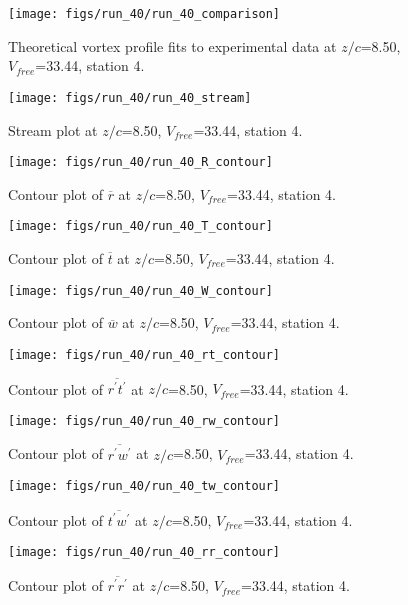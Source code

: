 \begin{figure}[H]
\centering
\texttt{[image: figs/run\_40/run\_40\_comparison]}
\caption{Theoretical vortex profile fits to experimental data at $z/c$=8.50, $V_{free}$=33.44, station 4.}
\end{figure}


\begin{figure}[H]
\centering
\texttt{[image: figs/run\_40/run\_40\_stream]}
\caption{Stream plot at $z/c$=8.50, $V_{free}$=33.44, station 4.}
\end{figure}


\begin{figure}[H]
\centering
\texttt{[image: figs/run\_40/run\_40\_R\_contour]}
\caption{Contour plot of $\overline{r}$ at $z/c$=8.50, $V_{free}$=33.44, station 4.}
\end{figure}


\begin{figure}[H]
\centering
\texttt{[image: figs/run\_40/run\_40\_T\_contour]}
\caption{Contour plot of $\overline{t}$ at $z/c$=8.50, $V_{free}$=33.44, station 4.}
\end{figure}


\begin{figure}[H]
\centering
\texttt{[image: figs/run\_40/run\_40\_W\_contour]}
\caption{Contour plot of $\overline{w}$ at $z/c$=8.50, $V_{free}$=33.44, station 4.}
\end{figure}


\begin{figure}[H]
\centering
\texttt{[image: figs/run\_40/run\_40\_rt\_contour]}
\caption{Contour plot of $\overline{r^\prime t^\prime}$ at $z/c$=8.50, $V_{free}$=33.44, station 4.}
\end{figure}


\begin{figure}[H]
\centering
\texttt{[image: figs/run\_40/run\_40\_rw\_contour]}
\caption{Contour plot of $\overline{r^\prime w^\prime}$ at $z/c$=8.50, $V_{free}$=33.44, station 4.}
\end{figure}


\begin{figure}[H]
\centering
\texttt{[image: figs/run\_40/run\_40\_tw\_contour]}
\caption{Contour plot of $\overline{t^\prime w^\prime}$ at $z/c$=8.50, $V_{free}$=33.44, station 4.}
\end{figure}


\begin{figure}[H]
\centering
\texttt{[image: figs/run\_40/run\_40\_rr\_contour]}
\caption{Contour plot of $\overline{r^\prime r^\prime}$ at $z/c$=8.50, $V_{free}$=33.44, station 4.}
\end{figure}


